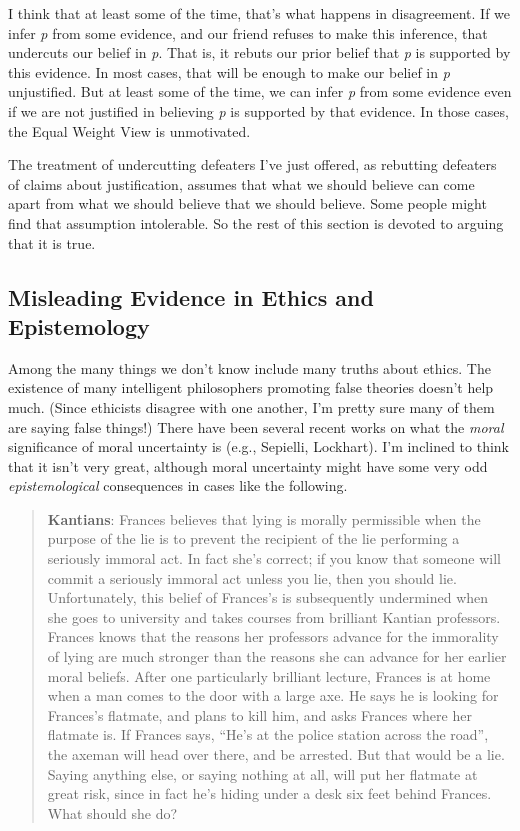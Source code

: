 \documentclass[
  11pt,
  letterpaper,
  DIV=11,
  numbers=noendperiod,
  twoside]{scrartcl}
\begin{document}
I think that at least some of the time, that's what happens in
disagreement. If we infer \emph{p} from some evidence, and our friend
refuses to make this inference, that undercuts our belief in \emph{p}.
That is, it rebuts our prior belief that \emph{p} is supported by this
evidence. In most cases, that will be enough to make our belief in
\emph{p} unjustified. But at least some of the time, we can infer
\emph{p} from some evidence even if we are not justified in believing
\emph{p} is supported by that evidence. In those cases, the Equal Weight
View is unmotivated.

The treatment of undercutting defeaters I've just offered, as rebutting
defeaters of claims about justification, assumes that what we should
believe can come apart from what we should believe that we should
believe. Some people might find that assumption intolerable. So the rest
of this section is devoted to arguing that it is true.

\subsection{Misleading Evidence in Ethics and
Epistemology}\label{misleading-evidence-in-ethics-and-epistemology}

Among the many things we don't know include many truths about ethics.
The existence of many intelligent philosophers promoting false theories
doesn't help much. (Since ethicists disagree with one another, I'm
pretty sure many of them are saying false things!) There have been
several recent works on what the \emph{moral} significance of moral
uncertainty is (e.g., Sepielli, Lockhart). I'm inclined to think that it
isn't very great, although moral uncertainty might have some very odd
\emph{epistemological} consequences in cases like the following.

\begin{quote}
\textbf{Kantians}: Frances believes that lying is morally permissible
when the purpose of the lie is to prevent the recipient of the lie
performing a seriously immoral act. In fact she's correct; if you know
that someone will commit a seriously immoral act unless you lie, then
you should lie. Unfortunately, this belief of Frances's is subsequently
undermined when she goes to university and takes courses from brilliant
Kantian professors. Frances knows that the reasons her professors
advance for the immorality of lying are much stronger than the reasons
she can advance for her earlier moral beliefs. After one particularly
brilliant lecture, Frances is at home when a man comes to the door with
a large axe. He says he is looking for Frances's flatmate, and plans to
kill him, and asks Frances where her flatmate is. If Frances says,
``He's at the police station across the road'', the axeman will head
over there, and be arrested. But that would be a lie. Saying anything
else, or saying nothing at all, will put her flatmate at great risk,
since in fact he's hiding under a desk six feet behind Frances. What
should she do?
\end{quote}
\end{document}
